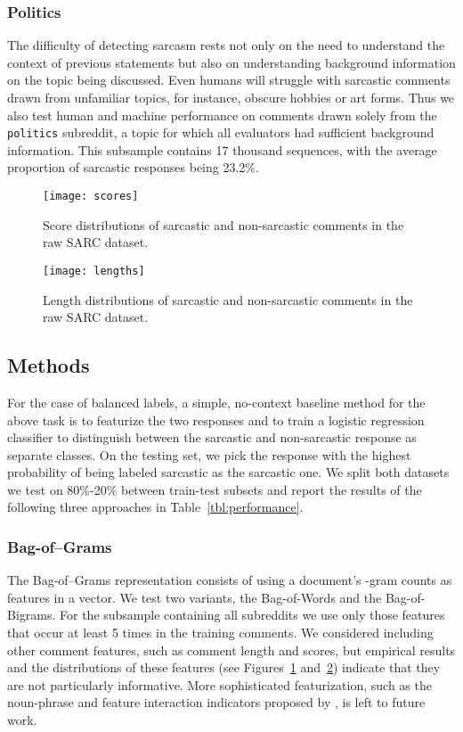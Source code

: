\documentclass[10pt, a4paper]{article}
\begin{document}
\subsubsection{Politics}
The difficulty of detecting sarcasm rests not only on the need to understand the context of previous statements but also on understanding background information on the topic being discussed.
Even humans will struggle with sarcastic comments drawn from unfamiliar topics, for instance, obscure hobbies or art forms.
Thus we also test human and machine performance on comments drawn solely from the \texttt{politics} subreddit, a topic for which all evaluators had sufficient background information.
This subsample contains 17 thousand sequences, with the average proportion of sarcastic responses being 23.2\%.

\begin{figure}
	\centering
	\texttt{[image: scores]}
	\caption{\label{fig:scores} Score distributions of sarcastic and non-sarcastic comments in the raw SARC dataset.}
\end{figure}

\begin{figure}
	\centering
	\texttt{[image: lengths]}
	\caption{\label{fig:lengths} Length distributions of sarcastic and non-sarcastic comments in the raw SARC dataset.}
\end{figure}

\subsection{Methods}
\label{subsec:methods}
For the case of balanced labels, a simple, no-context baseline method for the above task is to featurize the two responses and to train a logistic regression classifier to distinguish between the sarcastic and non-sarcastic response as separate classes.
On the testing set, we pick the response with the highest probability of being labeled sarcastic as the sarcastic one.
We split both datasets we test on 80\%-20\% between train-test subsets and report the results of the following three approaches in Table~\ref{tbl:performance}.

\subsubsection{Bag-of--Grams}
\label{subsec:bong}

The Bag-of--Grams representation consists of using a document's -gram counts as features in a vector.
We test two variants, the Bag-of-Words and the Bag-of-Bigrams.
For the subsample containing all subreddits we use only those features that occur at least 5 times in the training comments.
We considered including other comment features, such as comment length and scores, but empirical results and the distributions of these features (see Figures~\ref{fig:scores} and~\ref{fig:lengths}) indicate that they are not particularly informative.
More sophisticated featurization, such as the noun-phrase and feature interaction indicators proposed by \cite{Wallace:14}, is left to future work.
\end{document}
